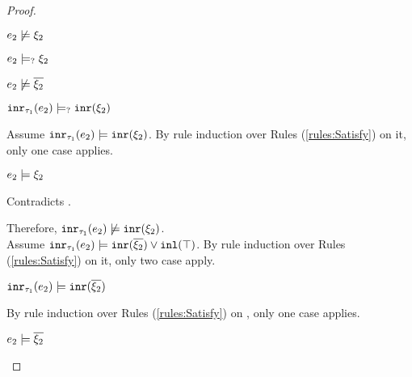 \begin{proof}
\begin{byCases}
\begin{byCases}
\begin{byCases}
\begin{pfsteps*}
            \item $e_2 \not\models \xi_2$  
            \item $e_2 \models_{?} \xi_2$  
            \item $e_2 \not\models \overline{\xi_2}$  
            \item $\mathtt{inr}_{\tau_1}({e_2}) \models_{?} \mathtt{inr}(\xi_2)$ 
            \end{pfsteps*}
            Assume $\mathtt{inr}_{\tau_1}({e_2}) \models \mathtt{inr}(\xi_2)$. By rule induction over Rules (\ref{rules:Satisfy}) on it, only one case applies.
            \begin{byCases}
            \item[\text{(\ref{rule:CSInr})}]
                \begin{pfsteps*}
                \item $e_2 \models \xi_2$
                \end{pfsteps*}
                Contradicts .
            \end{byCases}
            Therefore, $\mathtt{inr}_{\tau_1}({e_2}) \not\models \mathtt{inr}(\xi_2)$.\\
            Assume $\mathtt{inr}_{\tau_1}({e_2}) \models \mathtt{inr}(\overline{\xi_2}) \vee \mathtt{inl}(\top)$. By rule induction over Rules (\ref{rules:Satisfy}) on it, only two case apply.
            \begin{byCases}
            \item[\text{(\ref{rule:CSOr1})}]
                \begin{pfsteps*}
                \item $\mathtt{inr}_{\tau_1}({e_2}) \models \mathtt{inr}(\overline{\xi_2})$  
                \end{pfsteps*}
                By rule induction over Rules (\ref{rules:Satisfy}) on , only one case applies.
                \begin{byCases}
                \item[\text{(\ref{rule:CSInr})}]
                    \begin{pfsteps*}
                    \item $e_2 \models \overline{\xi_2}$ 
                    \end{pfsteps*}

\end{byCases}
\end{byCases}
\end{byCases}
\end{byCases}
\end{byCases}
\end{proof}
